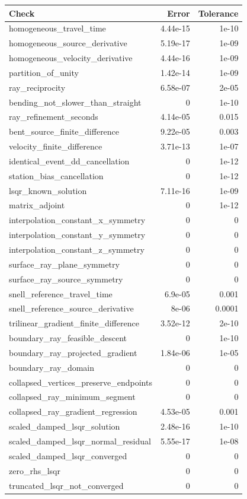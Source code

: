 \begin{longtable}{lrr}\toprule Check & Error & Tolerance\\\midrule
homogeneous\_travel\_time & 4.44e-15 & 1e-10\\
homogeneous\_source\_derivative & 5.19e-17 & 1e-09\\
homogeneous\_velocity\_derivative & 4.44e-16 & 1e-09\\
partition\_of\_unity & 1.42e-14 & 1e-09\\
ray\_reciprocity & 6.58e-07 & 2e-05\\
bending\_not\_slower\_than\_straight & 0 & 1e-10\\
ray\_refinement\_seconds & 4.14e-05 & 0.015\\
bent\_source\_finite\_difference & 9.22e-05 & 0.003\\
velocity\_finite\_difference & 3.71e-13 & 1e-07\\
identical\_event\_dd\_cancellation & 0 & 1e-12\\
station\_bias\_cancellation & 0 & 1e-12\\
lsqr\_known\_solution & 7.11e-16 & 1e-09\\
matrix\_adjoint & 0 & 1e-12\\
interpolation\_constant\_x\_symmetry & 0 & 0\\
interpolation\_constant\_y\_symmetry & 0 & 0\\
interpolation\_constant\_z\_symmetry & 0 & 0\\
surface\_ray\_plane\_symmetry & 0 & 0\\
surface\_ray\_source\_symmetry & 0 & 0\\
snell\_reference\_travel\_time & 6.9e-05 & 0.001\\
snell\_reference\_source\_derivative & 8e-06 & 0.0001\\
trilinear\_gradient\_finite\_difference & 3.52e-12 & 2e-10\\
boundary\_ray\_feasible\_descent & 0 & 1e-10\\
boundary\_ray\_projected\_gradient & 1.84e-06 & 1e-05\\
boundary\_ray\_domain & 0 & 0\\
collapsed\_vertices\_preserve\_endpoints & 0 & 0\\
collapsed\_ray\_minimum\_segment & 0 & 0\\
collapsed\_ray\_gradient\_regression & 4.53e-05 & 0.001\\
scaled\_damped\_lsqr\_solution & 2.48e-16 & 1e-10\\
scaled\_damped\_lsqr\_normal\_residual & 5.55e-17 & 1e-08\\
scaled\_damped\_lsqr\_converged & 0 & 0\\
zero\_rhs\_lsqr & 0 & 0\\
truncated\_lsqr\_not\_converged & 0 & 0\\
\bottomrule\end{longtable}
